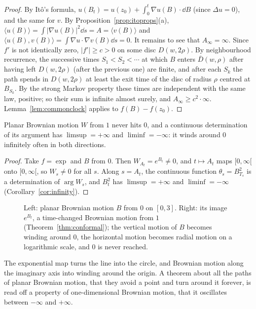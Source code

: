 \begin{proof}
By It\^o's formula, $u(B_t)=u(z_0)+\int_0^t\nabla u(B)\cdot\dd B$ (since $\Delta u=0$), and the same for $v$. By Proposition~\ref{prop:itoprops}(a), $\langle u(B)\rangle=\int|\nabla u(B)|^2\dd s=A=\langle v(B)\rangle$ and
$\langle u(B),v(B)\rangle=\int\nabla u\cdot\nabla v(B)\dd s=0$. It remains to see that $A_\infty=\infty$. Since $f'$ is not identically zero, $|f'|\ge c>0$ on some disc $D(w,2\rho)$. By neighbourhood recurrence, the successive times
$S_1<S_2<\cdots$ at which $B$ enters $\bar D(w,\rho)$ after having left $D(w,2\rho)$ (after the previous one) are finite, and after each $S_k$ the path spends in $D(w,2\rho)$ at least the exit time of the disc of radius $\rho$ centred at
$B_{S_k}$. By the strong Markov property these times are independent with the same law, positive; so their sum is infinite almost surely, and $A_\infty\ge c^2\cdot\infty$. Lemma~\ref{lem:commonclock} applies to
$f(B)-f(z_0)$.
\end{proof}

\begin{corollary}[L\'evy]\label{cor:winding}
Planar Brownian motion $W$ from $1$ never hits $0$, and a continuous determination of its argument has $\limsup=+\infty$ and $\liminf=-\infty$: it winds around $0$ infinitely often in both directions.
\end{corollary}

\begin{proof}
Take $f=\exp$ and $B$ from $0$. Then $W_{A_t}=e^{B_t}\ne0$, and $t\mapsto A_t$ maps $[0,\infty[$ onto $[0,\infty[$, so $W_s\ne0$ for all $s$. Along $s=A_t$, the continuous function $\theta_s=B^2_{T_s}$ is a determination of
$\arg W_s$, and $B^2_t$ has $\limsup=+\infty$ and $\liminf=-\infty$ (Corollary~\ref{cor:infinity}).
\end{proof}

\begin{figure}[ht]
\centering
{}
\caption{Left: planar Brownian motion $B$ from $0$ on $[0,3]$. Right: its image $e^{B_t}$, a time-changed Brownian motion from $1$ (Theorem~\ref{thm:conformal}); the vertical motion of $B$ becomes winding around
$0$, the horizontal motion becomes radial motion on a logarithmic scale, and $0$ is never reached.}
\label{fig:winding}
\end{figure}

\begin{beauty}
The exponential map turns the line into the circle, and Brownian motion along the imaginary axis into winding around the origin. A theorem about all the paths of planar Brownian motion, that they avoid a point and
turn around it forever, is read off a property of one-dimensional Brownian motion, that it oscillates between $-\infty$ and $+\infty$.
\end{beauty}

